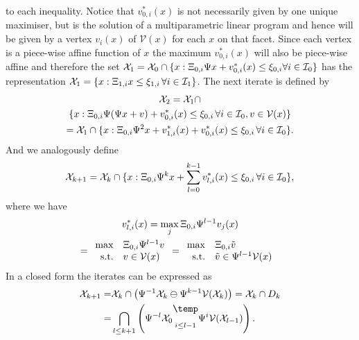 \documentclass[letterpaper, 10pt, conference]{ieeeconf} %
\newcommand{\bigominus}{\raisebox{10pt}{$\temp$}}
\begin{document}
%
to each inequality.
Notice that $v_{0,i}^\ast(x)$ is not necessarily given by one unique maximiser, 
but is the solution of a multiparametric linear program and hence will be given 
by a vertex $v_i(x)$ of $\mathcal V(x)$ for each $x$ on that facet.
Since each vertex is a piece-wise affine function of $x$ the maximum $v_{0,i}^\ast(x)$ will also
be piece-wise affine
and therefore the set $\mathcal X_1=\mathcal X_0 \cap \{x:\Xi_{0,i}\Psi x + v_{0,i}^\ast(x) \leq 
\xi_{0,i}\forall i\in\mathcal I_0\}$
has the representation $\mathcal X_1 = \{x:\Xi_{1,i}x\leq\xi_{1,i}\,\forall i\in\mathcal I_1\}$.
The next iterate is defined by
%
\begin{multline}
	\mathcal X_2 = \mathcal X_1 \cap \\ \{x:\Xi_{0,i}\Psi(\Psi x + v) + v_{0,i}^\ast(x)\leq\xi_{0,i}\,
	\forall i\in\mathcal I_0,v\in\mathcal V(x)\}\\
	= \mathcal X_1 \cap \{x: \Xi_{0,i}\Psi^2 x + v_{1,i}^\ast(x) + v_{0,i}^\ast(x)\leq\xi_{0,i}\,\forall 
	i\in\mathcal I_0\}.
\end{multline}
%
And we analogously define
%
\begin{equation}
	\mathcal X_{k+1} = \mathcal X_k\cap \{x:\Xi_{0,i}\Psi^k x + \sum_{l=0}^{k-1}v_{l,i}^\ast(x)
	\leq\xi_{0,i}\,\forall i\in\mathcal I_0\},
\end{equation}
%
where we have 
%
\begin{multline}
	v_{l,i}^\ast(x)=\max_j \genmat_{0,i}\Psi^{l-1}v_j(x)\\
	 = \begin{array}{rl} \max& \genmat_{0,i}\Psi^{l-1}v \\ \text{s.t.}& v\in\mathcal V(x)\end{array}
	 = \begin{array}{rl} \max& \genmat_{0,i}\tilde v\\ \text{s.t.}& \tilde v\in \Psi^{l-1}\mathcal V(x) \end{array}
\end{multline}
%
In a closed form the iterates can be expressed as
%
\begin{equation}\label{eq:set:iteration:state:dependent:constraints}
\begin{split}
	\mathcal X_{k+1} =& \mathcal X_k\cap\left(\Psi^{-1}\mathcal X_k \ominus \Psi^{k-1}\mathcal V(\mathcal X_k)\right)
	=\mathcal X_k\cap D_k \\
	=& \bigcap_{l\leq k+1}\left( \Psi^{-l} \mathcal X_0 \underset{i\leq l-1}{\bigominus} \Psi^i \mathcal V(\mathcal X_{l-1})\right).
\end{split}\end{equation}
\end{document}
